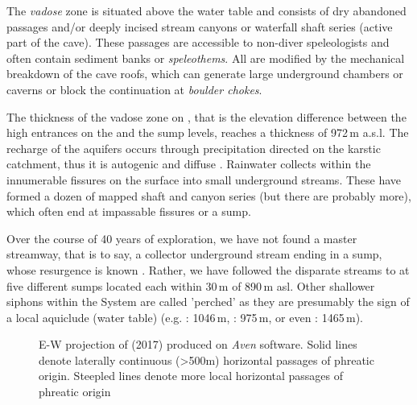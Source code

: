  The \emph{vadose} zone is situated above the water table and consists of dry abandoned passages and/or deeply incised stream canyons or waterfall shaft series (active part of the cave). These passages are accessible to non-diver speleologists and often contain sediment banks or \emph{speleothems}. All are modified by the mechanical breakdown of the cave roofs, which can generate large underground chambers or caverns or block the continuation at \emph{boulder chokes}. 

The thickness of the vadose zone on , that is the elevation difference between the high entrances on the  and the sump levels, reaches a thickness of 972\,m a.s.l. The recharge of the  aquifers occurs through   precipitation directed on the karstic catchment, thus it is autogenic and diffuse \citep{ford2013karst}. Rainwater collects within the innumerable fissures on the surface into small underground streams. These have formed a dozen of mapped shaft and canyon series (but there are probably more), which often end at impassable fissures or a sump. 

Over the course of 40 years of exploration, we have not found a master streamway, that is to say, a collector underground stream ending in a sump, whose resurgence is known \citep{hm1}. Rather, we have followed the disparate streams to at five different sumps located each within 30\,m of 890\,m asl. Other shallower siphons within the System are called 'perched'  as they are presumably the sign of a local aquiclude (water table) (e.g. : 1046\,m, : 975\,m, or even : 1465\,m).

\begin{figure}[t!]
 \checkoddpage \ifoddpage \forcerectofloat \else \forceversofloat \fi
\centering
{}
\caption{E-W projection of \protect{} (2017) produced on \emph{Aven} software. Solid lines denote laterally continuous (>500m) horizontal passages of phreatic origin. Steepled lines denote more local horizontal passages of phreatic origin} \label{fig:ew projection}
\end{figure}


